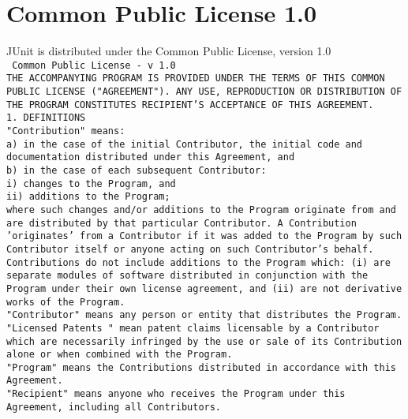 \section{Common Public License 1.0}

\setlength{\baselineskip}{\oldbaselineskip}
\noindent
JUnit is distributed under the Common Public License, version 1.0
\\

\setlength{\baselineskip}{0.5\oldbaselineskip}
{\tiny\tt
\noindent
Common Public License - v 1.0
\\[4pt]
THE ACCOMPANYING PROGRAM IS PROVIDED UNDER THE TERMS OF THIS COMMON
PUBLIC LICENSE ("AGREEMENT"). ANY USE, REPRODUCTION OR DISTRIBUTION OF
THE PROGRAM CONSTITUTES RECIPIENT'S ACCEPTANCE OF THIS AGREEMENT.
\\[4pt]
1. DEFINITIONS
\\[4pt]
"Contribution" means:
\\[4pt]
      a) in the case of the initial Contributor, the initial code and
      documentation distributed under this Agreement, and
\\[4pt]
      b) in the case of each subsequent Contributor:
\\[4pt]
      i) changes to the Program, and
\\[4pt]
      ii) additions to the Program;
\\[4pt]
      where such changes and/or additions to the Program originate
      from and are distributed by that particular Contributor. A
      Contribution 'originates' from a Contributor if it was added to
      the Program by such Contributor itself or anyone acting on such
      Contributor's behalf. Contributions do not include additions to
      the Program which: (i) are separate modules of software
      distributed in conjunction with the Program under their own
      license agreement, and (ii) are not derivative works of the
      Program.
\\[4pt]
"Contributor" means any person or entity that distributes the Program.
\\[4pt]
"Licensed Patents " mean patent claims licensable by a Contributor
which are necessarily infringed by the use or sale of its Contribution
alone or when combined with the Program.
\\[4pt]
"Program" means the Contributions distributed in accordance with this Agreement.
\\[4pt]
"Recipient" means anyone who receives the Program under this
Agreement, including all Contributors.
\\[4pt]
}
